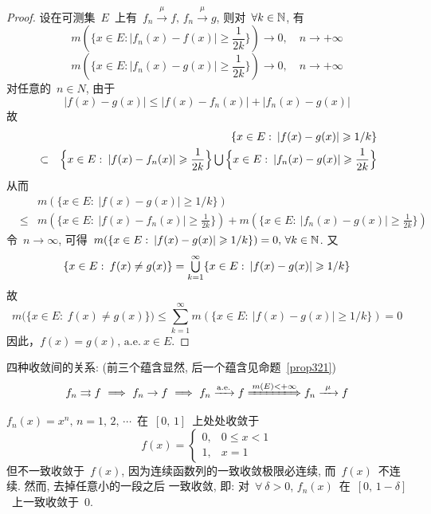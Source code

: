 \begin{proof}
设在可测集~$E$~上有~$f_n \xrightarrow{~\mu~} f,\, f_n \xrightarrow{~\mu~} g$, 则对~$\forall k \in \mathbb{N}$, 有
\[
m(\{x \in E: |f_n(x) - f(x)| \geqslant \frac{1}{2k}\}) \to 0, \quad n \to +\infty
\]
\[
m(\{x \in E: |f_n(x) - g(x)| \geqslant \frac{1}{2k}\}) \to 0, \quad n \to +\infty
\]
对任意的~$n \in N$, 由于
\[
|f(x) - g(x)| \leqslant |f(x) - f_n(x)| + |f_n(x) - g(x)|
\]
故
\begin{eqnarray*}
&& \{x \in E: \: |f(x) - g(x)| \geqslant 1/k\} \\
&\subset& \Big\{x \in E: \: |f(x) - f_n(x)| \geqslant \frac{1}{2k} \Big\} \mathop{\textstyle{\bigcup}} \Big\{x \in E: \: |f_n(x) - g(x)| \geqslant \frac{1}{2k} \Big\}
\end{eqnarray*}
从而
\begin{eqnarray*}
	&& m(\{x \in E: \: |f(x) - g(x)| \geqslant 1/k\}) \\
	&\leqslant& m(\Big\{x \in E: \: |f(x) - f_n(x)| \geqslant \frac{1}{2k} \Big\}) + m(\Big\{x \in E: \: |f_n(x) - g(x)| \geqslant \frac{1}{2k} \Big\})
\end{eqnarray*}
令~$n \to \infty$, 可得~$m(\{x \in E: \: |f(x) - g(x)| \geqslant 1/k\})=0, \, \forall k \in \mathbb{N}$. 又
\[
\{x \in E: \: f(x) \neq g(x)\} = \mathop{\textstyle{\bigcup}}_{k=1}^\infty\{ x \in E: \: |f(x) - g(x)| \geqslant 1/k \}
\]
故
\[
m\big(\{x \in E: \: f(x) \neq g(x)\}\big) \leqslant \sum_{k=1}^\infty m(\{x \in E: \: |f(x) - g(x)| \geqslant 1/k\}) = 0
\]
因此，$f(x) = g(x), \, \mathrm{a.e.~} x \in E$.
\end{proof}

四种收敛间的关系: (前三个蕴含显然, 后一个蕴含见命题~\ref{prop321})
\[
f_n \rightrightarrows f ~ \Longrightarrow ~ f_n \rightarrow f ~ \Longrightarrow ~ f_n \xrightarrow{\mathrm{a.e.}} f \xLongrightarrow{m(E)<+\infty} f_n \xrightarrow{~\mu~} f
\]

\begin{example}[收敛但不一致收敛]
$f_n(x) = x^n, \, n=1,\,2,\,\cdots$~在~$[0,\,1]$~上处处收敛于
\[
f(x) = \left\{\!\!
\begin{array}{ll}
0, &  0 \leqslant x < 1 \\
1, &  x = 1
\end{array}
\right.
\]
但不一致收敛于~$f(x)$, 因为连续函数列的一致收敛极限必连续, 而~$f(x)$~不连续. 然而, 去掉任意小的一段之后
一致收敛, 即: 对~$\forall~\delta > 0$, $f_n(x)$~在~$[0,\,1-\delta]$~上一致收敛于~$0$.
\end{example}

